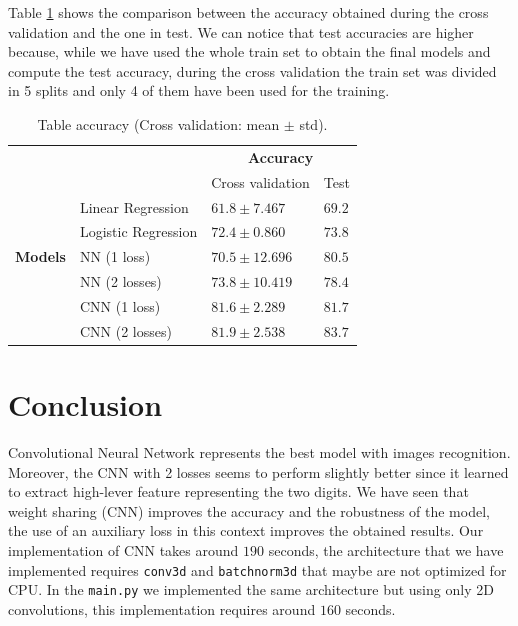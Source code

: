 \documentclass[journal, a4paper]{IEEEtran}
\begin{document}
Table \ref{table:accuracy} shows the comparison between the accuracy obtained during the cross validation and the one in test. We can notice that test accuracies are higher because, while we have used the whole train set to obtain the final models and compute the test accuracy, during the cross validation the train set was divided in 5 splits and only 4 of them have been used for the training.
\begin{table}
\centering
\caption{Table accuracy (Cross validation: mean $\pm$ std).}
\label{table:accuracy}
\begin{tabular}{|l|l|l|l|} 
\cline{3-4}
\multicolumn{1}{l}{} &                     & \multicolumn{2}{c|}{\textbf{Accuracy}}  \\ 
\cline{3-4}
\multicolumn{1}{l}{} &                     & Cross validation & Test                 \\ 
\hline
                     & Linear Regression   & $61.8\pm7.467$    & $69.2$                 \\ 
\cline{2-4}
     & Logistic Regression & $72.4 \pm0.860$    & $73.8$                 \\ 
\cline{2-4}
\textbf{Models}    & NN (1 loss)~        & $70.5 \pm12.696$   & $80.5$                 \\ 
\cline{2-4}
                     & NN (2 losses)~      & $73.8 \pm10.419$   & $78.4$                 \\ 
\cline{2-4}
                     & CNN (1 loss)~       & $81.6 \pm2.289$    & $81.7$                 \\ 
\cline{2-4}
                     & CNN (2 losses)      & $81.9 \pm2.538$    & $83.7$                 \\
\hline
\end{tabular}
\end{table}

\section{Conclusion}
\label{sec:conclusion}
Convolutional Neural Network represents the best model with images recognition. Moreover, the CNN with 2 losses seems to perform slightly better since it learned to extract high-lever feature representing the two digits. We have seen that weight sharing (CNN) improves the accuracy and the robustness of the model, the use of an auxiliary loss in this context improves the obtained results. Our implementation of CNN takes around $190$ seconds, the architecture that we have implemented requires \texttt{conv3d} and \texttt{batchnorm3d} that maybe are not optimized for CPU. In the \texttt{main.py} we implemented the same architecture but using only 2D convolutions, this implementation requires around $160$ seconds.
\end{document}
